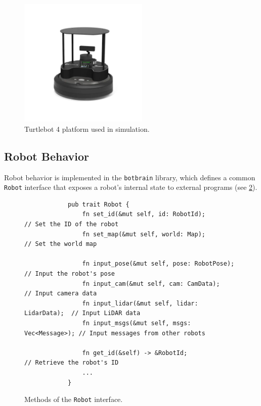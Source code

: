 \begin{figure}[h]
    \begin{center}
        \includegraphics[width=0.55\textwidth]{figures/tb4.png}
    \end{center}
    \caption{Turtlebot 4 platform used in simulation.}
    \label{fig:tb4}
\end{figure}

\subsection{Robot Behavior}
Robot behavior is implemented in the \texttt{botbrain} library, which defines a common \texttt{Robot} interface that exposes a robot’s internal state to external programs (see \cref{fig:robot-interface}).

\begin{figure}[H]
    \begin{center}
        \begin{verbatim}
            pub trait Robot {
                fn set_id(&mut self, id: RobotId);            // Set the ID of the robot
                fn set_map(&mut self, world: Map);            // Set the world map

                fn input_pose(&mut self, pose: RobotPose);    // Input the robot's pose
                fn input_cam(&mut self, cam: CamData);        // Input camera data
                fn input_lidar(&mut self, lidar: LidarData);  // Input LiDAR data
                fn input_msgs(&mut self, msgs: Vec<Message>); // Input messages from other robots

                fn get_id(&self) -> &RobotId;                 // Retrieve the robot's ID
                ...
            }
        \end{verbatim}
    \end{center}
    \caption{Methods of the \texttt{Robot} interface.}
    \label{fig:robot-interface}
\end{figure}

